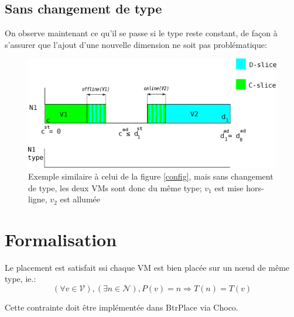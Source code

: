 \documentclass[a4paper]{article}
\begin{document}
\subsection{Sans changement de type}
On observe maintenant ce qu'il se passe si le type reste constant, de
façon à s'assurer que l'ajout d'une nouvelle dimension ne soit pas
problématique:
\begin{figure}[!ht]
	\centering
	\includegraphics[scale=.45]{imgs/config2.eps}
	\caption{\label{config2} Exemple similaire à celui de la figure
		\ref{config}, mais sans changement de type, les deux VMs sont
		donc du même type; $v_1$ est mise hors-ligne, $v_2$ est allumée}
\end{figure}

\section{Formalisation}
Le placement est satisfait ssi chaque VM est bien placée sur
un nœud de même type, ie.:
\[
	(\forall v \in \mathcal V), (\exists n \in \mathcal N), P(v) = n
		\Rightarrow T(n) = T(v)	
\]

Cette contrainte doit être implémentée dans BtrPlace via Choco.

\newpage
{}


\end{document}
